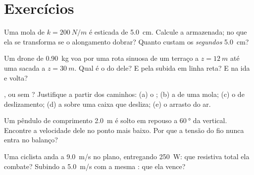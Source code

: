 \section{Exercícios}

\begin{exercise}[$\star$]\label{exo:g12:work-and-energy:1}
Uma mola de  $k = \qty{200}{N/m}$ é esticada de \qty{5.0}{cm}.
Calcule a  armazenada; no que ela se transforma se o alongamento dobrar? Quanto
custam os \emph{segundos} \qty{5.0}{cm}?
\end{exercise}

\begin{exercise}[$\star$]\label{exo:g12:work-and-energy:2}
Um drone de \qty{0.90}{kg} voa por uma rota sinuosa de um terraço a $z = \qty{12}{m}$
até uma sacada a $z = \qty{30}{m}$. Qual é o  do  dele? E pela subida em
linha reta? E na ida e volta?
\end{exercise}

\begin{exercise}[$\star$]\label{exo:g12:work-and-energy:3}
,  ou sem ? Justifique a partir dos caminhos: (a)
o ; (b) a  de uma mola; (c) o  de deslizamento; (d) a 
sobre uma caixa que desliza; (e) o arrasto do ar.
\end{exercise}

\begin{exercise}[$\star$]\label{exo:g12:work-and-energy:4}
Um pêndulo de comprimento \qty{2.0}{m} é solto em repouso a $\qty{60}{\degree}$ da
vertical. Encontre a velocidade dele no ponto mais baixo. Por que a tensão do fio nunca
entra no balanço?
\end{exercise}

\begin{exercise}[$\star$]\label{exo:g12:work-and-energy:5}
Uma ciclista anda a \qty{9.0}{m/s} no plano, entregando \qty{250}{W}: que 
resistiva total ela combate? Subindo a \qty{5.0}{m/s} com a mesma : que 
ela vence?
\end{exercise}

